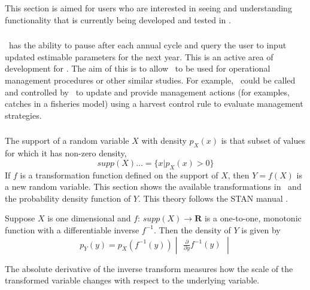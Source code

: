 \section{\label{sec:development-section}}

This section is aimed for users who are interested in seeing and understanding functionality that is currently being developed and tested in \CNAME. 


\subsubsection{\label{sec:singlestepping}}

\CNAME\ has the ability to pause after each annual cycle and query the user to input updated estimable parameters for the next year. This is an active area of development for \CNAME. The aim of this is to allow \CNAME\ to be used for operational management procedures or other similar studies. For example, \CNAME\ could be called and controlled by \R\ to update and provide management actions (for examples, catches in a fisheries model) using a harvest control rule to evaluate management strategies. 


\subsubsection{\label{sec:transformations}}
The support of a random variable $X$ with density $p_X(x)$ is that subset of values for which it has non-zero density, 
$$ supp(X) = \{x|p_X(x) > 0\}$$ 
If $f$ is a transformation function defined on the support of $X$, then $Y = f(X)$ is a new random variable. This section shows the available transformations in \CNAME\ and the probability density function of $Y$. This theory follows the STAN manual \cite{STAN}.

Suppose $X$ is one dimensional and $f$: $supp(X) \to \mathbf{R}$ is a one-to-one, monotonic function with a differentiable inverse $f^{-1}$. Then the density of $Y$ is given by
$$ p_Y(y) = p_X(f^{-1}(y)) \begin{vmatrix} \frac{\partial}{\partial y} f^{-1}(y) \end{vmatrix}$$

The absolute derivative of the inverse transform measures how the scale of the transformed
variable changes with respect to the underlying variable.


